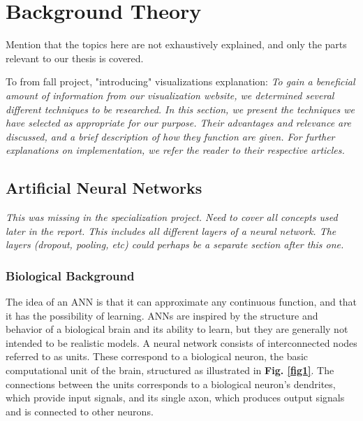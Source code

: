 
\chapter{Background Theory}

Mention that the topics here are not exhaustively explained, and only the parts relevant to our thesis is covered. 

To from fall project, "introducing" visualizations explanation:
\noindent \textit{To gain a beneficial amount of information from our visualization website, we determined several different techniques to be researched. In this section, we present the techniques we have selected as appropriate for our purpose. Their advantages and relevance are discussed, and a brief description of how they function are given. For further explanations on implementation, we refer the reader to their respective articles.}

\section{Artificial Neural Networks}

\textit{This was missing in the specialization project. Need to cover all concepts used later in the report. This includes all different layers of a neural network. The layers (dropout, pooling, etc) could perhaps be a separate section after this one.}

\subsection{Biological Background}

The idea of an ANN is that it can approximate any continuous function, and that it has the possibility of learning. ANNs are inspired by the structure and behavior of a biological brain and its ability to learn, but they are generally not intended to be realistic models. A neural network consists of interconnected nodes referred to as units. These correspond to a biological neuron, the basic computational unit of the brain, structured as illustrated in \textbf{Fig. \ref{fig1}}. The connections between the units corresponds to a biological neuron's dendrites, which provide input signals, and its single axon, which produces output signals and is connected to other neurons. \\

